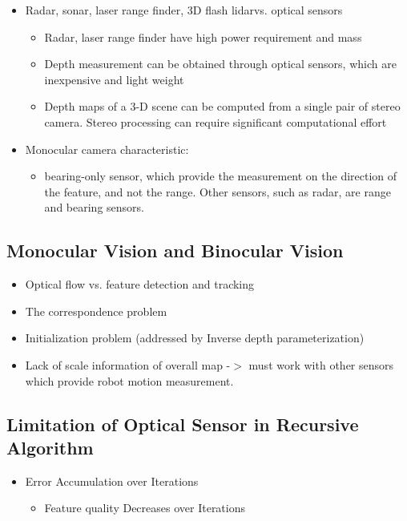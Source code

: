 \begin{itemize}
  \item Radar, sonar, laser range finder, 3D flash lidarvs. optical sensors
  \begin{itemize}
    \item Radar, laser range finder have high power requirement and mass
    \item Depth measurement can be obtained through optical sensors, which 
    are inexpensive and light weight
    \item Depth maps of a 3-D scene can be computed from a single pair of 
    stereo camera. Stereo processing can require significant computational 
    effort
  \end{itemize}
  \item Monocular camera characteristic: 
  \begin{itemize}
    \item bearing-only sensor, which provide the measurement on the 
    direction of the feature, and not the range. Other sensors, such as 
    radar, are range and bearing sensors. 
  \end{itemize}
\end{itemize}

\subsection{Monocular Vision and Binocular Vision}\label{sec:MonoBino}
\begin{itemize}
  \item Optical flow vs. feature detection and tracking
  \item The correspondence problem
  \item Initialization problem (addressed by Inverse depth 
  parameterization)
  \item Lack of scale information of overall map -$>$ must work with other 
  sensors which provide robot motion measurement. 
\end{itemize}

\subsection{Limitation of Optical Sensor in Recursive Algorithm}
\label{sec:OpticalSensorLimitation}

\begin{itemize}
  \item Error Accumulation over Iterations
  \begin{itemize}
    \item Feature quality Decreases over Iterations
  \end{itemize}
\end{itemize}


